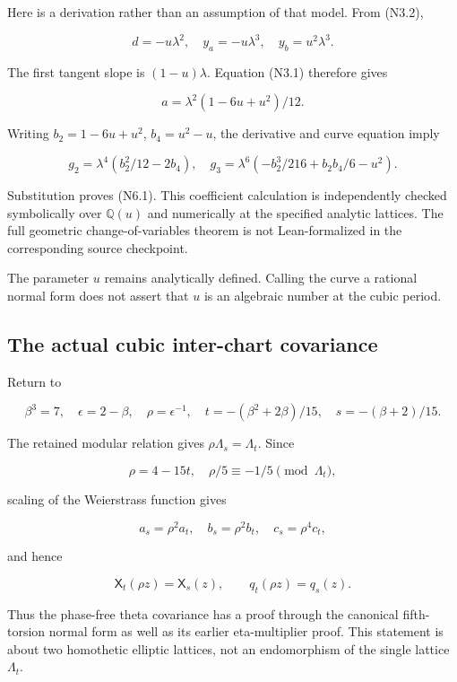Here is a derivation rather than an assumption of that model. From
(N3.2),

\[
 d=-u\lambda^2,\quad y_a=-u\lambda^3,\quad y_b=u^2\lambda^3.
\]

The first tangent slope is \((1-u)\lambda\). Equation (N3.1) therefore
gives

\[
 a=\lambda^2(1-6u+u^2)/12.
\]

Writing \(b_2=1-6u+u^2\), \(b_4=u^2-u\), the derivative and curve
equation imply

\[
 g_2=\lambda^4(b_2^2/12-2b_4),\quad
 g_3=\lambda^6(-b_2^3/216+b_2b_4/6-u^2).
\]

Substitution proves (N6.1). This coefficient calculation is
independently checked symbolically over \(\mathbb Q(u)\) and numerically
at the specified analytic lattices. The full geometric
change-of-variables theorem is not Lean-formalized in the corresponding
source checkpoint.

The parameter \(u\) remains analytically defined. Calling the curve a
rational normal form does not assert that \(u\) is an algebraic number
at the cubic period.

\hypertarget{N-the-actual-cubic-inter-chart-covariance}{%
\subsection{The actual cubic inter-chart
covariance}\label{N-the-actual-cubic-inter-chart-covariance}}

Return to

\[
 \beta^3=7,\quad\epsilon=2-\beta,\quad\rho=\epsilon^{-1},
 \quad t=-(\beta^2+2\beta)/15,\quad s=-(\beta+2)/15.
\]

The retained modular relation gives \(\rho\Lambda_s=\Lambda_t\). Since

\[
 \rho=4-15t,\quad\rho/5\equiv-1/5\pmod{\Lambda_t},
\]

scaling of the Weierstrass function gives

\[
 a_s=\rho^2a_t,\quad b_s=\rho^2b_t,\quad c_s=\rho^4c_t,
\]

and hence

\[
 \mathsf X_t(\rho z)=\mathsf X_s(z),\qquad
 \boxed{q_t(\rho z)=q_s(z).}                              \tag{N7.1}
\]

Thus the phase-free theta covariance has a proof through the canonical
fifth-torsion normal form as well as its earlier eta-multiplier proof.
This statement is about two homothetic elliptic lattices, not an
endomorphism of the single lattice \(\Lambda_t\).

